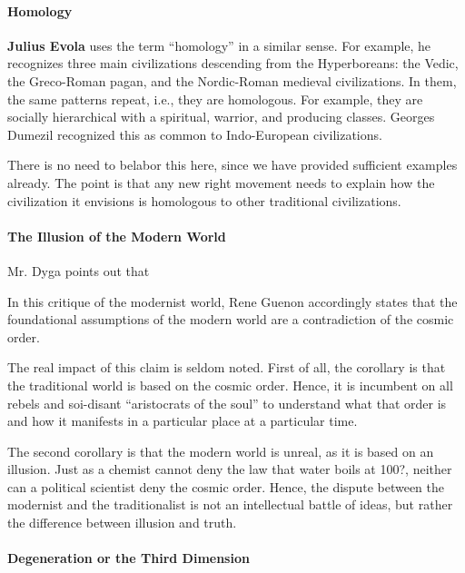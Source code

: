 \paragraph{Homology}


\textbf{Julius Evola} uses the term ``homology'' in a similar sense. For example, he recognizes three main civilizations descending from the Hyperboreans: the Vedic, the Greco-Roman pagan, and the Nordic-Roman medieval civilizations. In them, the same patterns repeat, i.e., they are homologous. For example, they are socially hierarchical with a spiritual, warrior, and producing classes. Georges Dumezil recognized this as common to Indo-European civilizations.

There is no need to belabor this here, since we have provided sufficient examples already. The point is that any new right movement needs to explain how the civilization it envisions is homologous to other traditional civilizations.

\paragraph{The Illusion of the Modern World}


Mr. Dyga points out that

\begin{quotex}
In this critique of the modernist world, Rene Guenon accordingly states that the foundational assumptions of the modern world are a contradiction of the cosmic order.
\end{quotex}


The real impact of this claim is seldom noted. First of all, the corollary is that the traditional world is based on the cosmic order. Hence, it is incumbent on all rebels and soi-disant ``aristocrats of the soul'' to understand what that order is and how it manifests in a particular place at a particular time.

The second corollary is that the modern world is unreal, as it is based on an illusion. Just as a chemist cannot deny the law that water boils at 100?, neither can a political scientist deny the cosmic order. Hence, the dispute between the modernist and the traditionalist is not an intellectual battle of ideas, but rather the difference between illusion and truth.

\paragraph{Degeneration or the Third Dimension}


